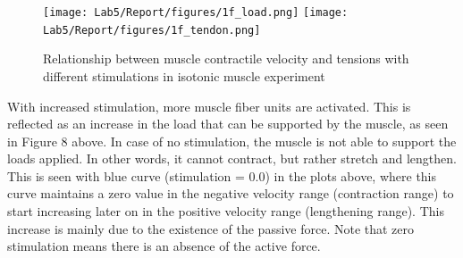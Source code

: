 \documentclass{cmc}
\begin{document}
\begin{figure}[H]
  \centering 
  \texttt{[image: Lab5/Report/figures/1f\_load.png]}
  \texttt{[image: Lab5/Report/figures/1f\_tendon.png]}
  \caption{Relationship between muscle contractile velocity and tensions with different stimulations in isotonic muscle experiment}
  \label{1f}
\end{figure}

With increased stimulation, more muscle fiber units are activated. This is reflected as an increase in the load that can be supported by the muscle, as seen in Figure 8 above. In case of no stimulation, the muscle is not able to support the loads applied. In other words, it cannot contract, but rather stretch and lengthen. This is seen with blue curve (stimulation = 0.0) in the plots above, where this curve maintains a zero value in the negative velocity range (contraction range) to start increasing later on in the positive velocity range (lengthening range). This increase is mainly due to the existence of the passive force. Note that zero stimulation means there is an absence of the active force.  
\end{document}
